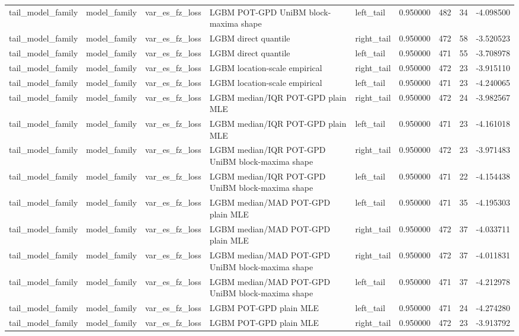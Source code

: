 \begin{tabular}{lllllrrrr}
tail\_model\_family & model\_family & var\_es\_fz\_loss & LGBM POT-GPD UniBM block-maxima shape & left\_tail & 0.950000 & 482 & 34 & -4.098500 \\
tail\_model\_family & model\_family & var\_es\_fz\_loss & LGBM direct quantile & right\_tail & 0.950000 & 472 & 58 & -3.520523 \\
tail\_model\_family & model\_family & var\_es\_fz\_loss & LGBM direct quantile & left\_tail & 0.950000 & 471 & 55 & -3.708978 \\
tail\_model\_family & model\_family & var\_es\_fz\_loss & LGBM location-scale empirical & right\_tail & 0.950000 & 472 & 23 & -3.915110 \\
tail\_model\_family & model\_family & var\_es\_fz\_loss & LGBM location-scale empirical & left\_tail & 0.950000 & 471 & 23 & -4.240065 \\
tail\_model\_family & model\_family & var\_es\_fz\_loss & LGBM median/IQR POT-GPD plain MLE & right\_tail & 0.950000 & 472 & 24 & -3.982567 \\
tail\_model\_family & model\_family & var\_es\_fz\_loss & LGBM median/IQR POT-GPD plain MLE & left\_tail & 0.950000 & 471 & 23 & -4.161018 \\
tail\_model\_family & model\_family & var\_es\_fz\_loss & LGBM median/IQR POT-GPD UniBM block-maxima shape & right\_tail & 0.950000 & 472 & 23 & -3.971483 \\
tail\_model\_family & model\_family & var\_es\_fz\_loss & LGBM median/IQR POT-GPD UniBM block-maxima shape & left\_tail & 0.950000 & 471 & 22 & -4.154438 \\
tail\_model\_family & model\_family & var\_es\_fz\_loss & LGBM median/MAD POT-GPD plain MLE & left\_tail & 0.950000 & 471 & 35 & -4.195303 \\
tail\_model\_family & model\_family & var\_es\_fz\_loss & LGBM median/MAD POT-GPD plain MLE & right\_tail & 0.950000 & 472 & 37 & -4.033711 \\
tail\_model\_family & model\_family & var\_es\_fz\_loss & LGBM median/MAD POT-GPD UniBM block-maxima shape & right\_tail & 0.950000 & 472 & 37 & -4.011831 \\
tail\_model\_family & model\_family & var\_es\_fz\_loss & LGBM median/MAD POT-GPD UniBM block-maxima shape & left\_tail & 0.950000 & 471 & 37 & -4.212978 \\
tail\_model\_family & model\_family & var\_es\_fz\_loss & LGBM POT-GPD plain MLE & left\_tail & 0.950000 & 471 & 24 & -4.274280 \\
tail\_model\_family & model\_family & var\_es\_fz\_loss & LGBM POT-GPD plain MLE & right\_tail & 0.950000 & 472 & 23 & -3.913792 \\

\end{tabular}

